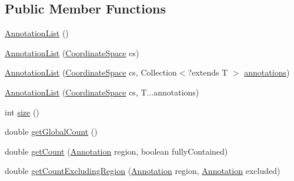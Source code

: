 \subsection*{Public Member Functions}
\begin{DoxyCompactItemize}
\item 
\hyperlink{classumms_1_1core_1_1annotation_1_1_annotation_list_3_01_t_01extends_01_annotation_01_4_a9a0da750a3eecca675638691ebac0cbd}{Annotation\+List} ()
\item 
\hyperlink{classumms_1_1core_1_1annotation_1_1_annotation_list_3_01_t_01extends_01_annotation_01_4_a7c48b5b3d2066889527e344562966e3c}{Annotation\+List} (\hyperlink{interfaceumms_1_1core_1_1coordinatesystem_1_1_coordinate_space}{Coordinate\+Space} cs)
\item 
\hyperlink{classumms_1_1core_1_1annotation_1_1_annotation_list_3_01_t_01extends_01_annotation_01_4_a331f47cc9de386608102b112c89b143c}{Annotation\+List} (\hyperlink{interfaceumms_1_1core_1_1coordinatesystem_1_1_coordinate_space}{Coordinate\+Space} cs, Collection$<$?extends T $>$ \hyperlink{classumms_1_1core_1_1annotation_1_1_annotation_list_3_01_t_01extends_01_annotation_01_4_a0822523251b80ee321b29730ecdc05d2}{annotations})
\item 
\hyperlink{classumms_1_1core_1_1annotation_1_1_annotation_list_3_01_t_01extends_01_annotation_01_4_a0547ca360f32a1e89d65bff755e3e950}{Annotation\+List} (\hyperlink{interfaceumms_1_1core_1_1coordinatesystem_1_1_coordinate_space}{Coordinate\+Space} cs, T...\+annotations)
\item 
int \hyperlink{classumms_1_1core_1_1annotation_1_1_annotation_list_3_01_t_01extends_01_annotation_01_4_aa3b719763750abc0dd09f44577007f85}{size} ()
\item 
double \hyperlink{classumms_1_1core_1_1annotation_1_1_annotation_list_3_01_t_01extends_01_annotation_01_4_a7f74f466dcdb91eb2a4a073c77362c86}{get\+Global\+Count} ()
\item 
double \hyperlink{classumms_1_1core_1_1annotation_1_1_annotation_list_3_01_t_01extends_01_annotation_01_4_a3fe337384000f17feddeb3146f7f7d2b}{get\+Count} (\hyperlink{interfaceumms_1_1core_1_1annotation_1_1_annotation}{Annotation} region, boolean fully\+Contained)
\item 
double \hyperlink{classumms_1_1core_1_1annotation_1_1_annotation_list_3_01_t_01extends_01_annotation_01_4_a3d4dc0c6465467606a23c0fd149328c0}{get\+Count\+Excluding\+Region} (\hyperlink{interfaceumms_1_1core_1_1annotation_1_1_annotation}{Annotation} region, \hyperlink{interfaceumms_1_1core_1_1annotation_1_1_annotation}{Annotation} excluded)

\end{DoxyCompactItemize}
